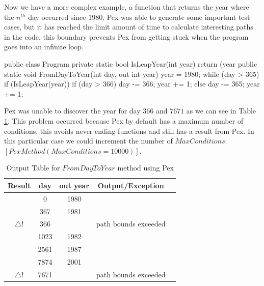 \documentclass[10pt, conference, compsocconf]{IEEEtran}
\newcommand{\checkK}{\color{ForestGreen}\checkmark}
\newcommand{\bigexclaim}{\color{Dandelion}$\bigtriangleup$\hspace{-5.6pt}!}
\begin{document}
Now we have a more complex example, a function that returns the year where the $n^{th}$ day occurred since 1980.
Pex was able to generate some important test cases, but it has reached the limit amount of time to calculate interesting paths in the code,
this boundary prevents Pex from getting stuck when the program goes into
an infinite loop.

\begin{code}
public class Program {
  private static bool IsLeapYear(int year) {
    return (year %
  }
  public static void FromDayToYear(int day, out int year) {
    year = 1980;
    while (day > 365) {
      if (IsLeapYear(year)) {
        if (day > 366) {
          day -= 366;
          year += 1;
        }
      } else {
        day -= 365;
        year += 1;
      }
    }
  }
}
\end{code}

Pex was unable to discover the year for day $366$ and $7671$ as we can see in Table \ref{tab:leap}.
This problem occurred because Pex by default has a maximum number of conditions, this avoids never ending functions and still has a result from Pex.
In this particular case we could increment the number of $MaxConditions$: $[PexMethod(MaxConditions=10000)]$.

\begin{table}[!ht]
\renewcommand{\arraystretch}{1.3}
\caption{Output Table for $FromDayToYear$ method using Pex}
\label{tab:leap}
\centering
\noindent \begin{tabular}{|c|c|c|c|c|}\hline
Result & day & out year & Output/Exception\\\hline
\checkK & 0 & 1980 & \\\hline
\checkK & 367 & 1981 & \\\hline
\bigexclaim & 366 & & path bounds exceeded\\\hline
\checkK & 1023 & 1982 &\\\hline
\checkK & 2561 & 1987 & \\\hline
\checkK & 7874 & 2001 & \\\hline
\bigexclaim &  7671 & & path bounds exceeded\\\hline
\end{tabular}
\end{table}
\end{document}
